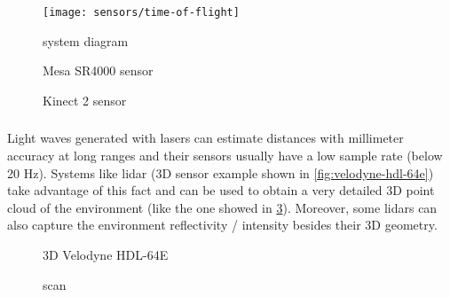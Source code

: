 \begin{figure}[H]
	\centering
	\texttt{[image: sensors/time-of-flight]}
	\caption[ system diagram]{ system diagram\protect\footnotemark}
	\label{fig:time-of-flight}
\end{figure}

\begin{figure}[H]
	\begin{floatrow}[2]
		{\caption[Mesa SR4000 sensor]{Mesa SR4000 sensor\protect\footnotemark}\label{fig:mesa-sr4000}}

		{\caption[Kinect 2 sensor]{Kinect 2 sensor\protect\footnotemark}\label{fig:kinect2}}
	\end{floatrow}
\end{figure}


\subsubsection{}

Light waves generated with lasers can estimate distances with millimeter accuracy at long ranges and their sensors usually have a low sample rate (below 20 Hz). Systems like \gls{lidar} (3D sensor example shown in \cref{fig:velodyne-hdl-64e}) take advantage of this fact and can be used to obtain a very detailed 3D point cloud of the environment (like the one showed in \cref{fig:lidar-scan}). Moreover, some \glspl{lidar} can also capture the environment reflectivity / intensity besides their 3D geometry.

\begin{figure}[H]
	\begin{floatrow}[2]
		{\caption[3D Velodyne HDL-64E]{3D Velodyne HDL-64E\protect\footnotemark}\label{fig:velodyne-hdl-64e}}

		{\caption[ scan]{ scan\protect\footnotemark}\label{fig:lidar-scan}}
	\end{floatrow}
\end{figure}
